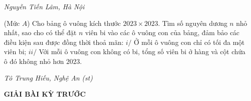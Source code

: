 \begin{multicols}{2}
	\begin{flushright}
		\textit{Nguyễn Tiến Lâm, Hà Nội}
	\end{flushright}
	{}
	(Mức $A$) Cho bảng ô vuông kích thước $2023\times 2023$. Tìm số nguyên dương $n$ nhỏ nhất, sao cho có thể đặt $n$ viên bi vào các ô vuông con của bảng, đảm bảo các điều kiện sau được đồng thời thoả mãn:
	\vskip 0.1cm
	$i/$ Ở mỗi ô vuông con chỉ có tối đa một viên bi;
	\vskip 0.1cm
	$ii/$ Với mỗi ô vuông con không có bi, tổng số viên bi ở hàng và cột chứa ô đó không nhỏ hơn $2023$.
	\begin{flushright}
		\textit{Tô Trung Hiếu, Nghệ An (st)}
	\end{flushright}
\end{multicols}
\newpage
\centerline{{\large{\textbf{\color{thachthuctoanhoc}\color{thachthuctoanhoc}GIẢI BÀI KỲ TRƯỚC}}}}
\vspace*{-5pt}
